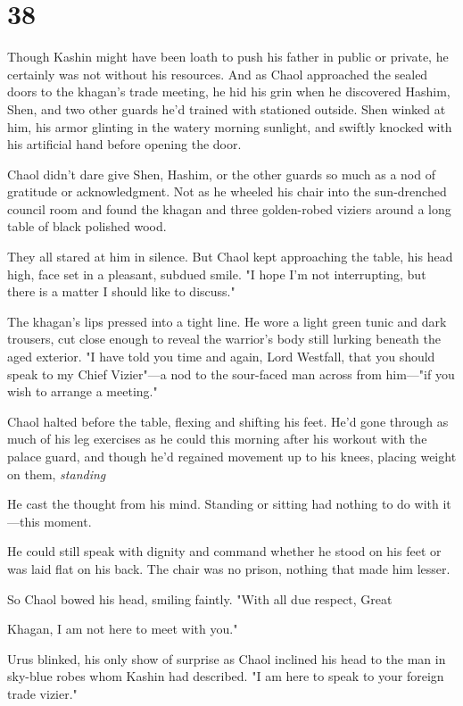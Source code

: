 
\chapter{38}

Though Kashin might have been loath to push his father in public or private, he certainly was not without his resources. And as Chaol approached the sealed doors to the khagan's trade meeting, he hid his grin when he discovered Hashim, Shen, and two other guards he'd trained with stationed outside. Shen winked at him, his armor glinting in the watery morning sunlight, and swiftly knocked with his artificial hand before opening the door.

Chaol didn't dare give Shen, Hashim, or the other guards so much as a nod of gratitude or acknowledgment. Not as he wheeled his chair into the sun-drenched council room and found the khagan and three golden-robed viziers around a long table of black polished wood.

They all stared at him in silence. But Chaol kept approaching the table, his head high, face set in a pleasant, subdued smile. "I hope I'm not interrupting, but there is a matter I should like to discuss."

The khagan's lips pressed into a tight line. He wore a light green tunic and dark trousers, cut close enough to reveal the warrior's body still lurking beneath the aged exterior. "I have told you time and again, Lord Westfall, that you should speak to my Chief Vizier"---a nod to the sour-faced man across from him---"if you wish to arrange a meeting."

Chaol halted before the table, flexing and shifting his feet. He'd gone through as much of his leg exercises as he could this morning after his workout with the palace guard, and though he'd regained movement up to his knees, placing weight on them, \emph{standing} 

He cast the thought from his mind. Standing or sitting had nothing to do with it---this moment.

He could still speak with dignity and command whether he stood on his feet or was laid flat on his back. The chair was no prison, nothing that made him lesser.

So Chaol bowed his head, smiling faintly. "With all due respect, Great

Khagan, I am not here to meet with you."

Urus blinked, his only show of surprise as Chaol inclined his head to the man in sky-blue robes whom Kashin had described. "I am here to speak to your foreign trade vizier."


